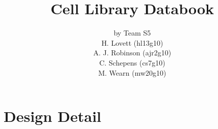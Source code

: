 \documentclass{article}         %
\newcommand{\cellname}[1] {\newpage \section{#1} \makebox[\linewidth]{\rule{\textwidth}{0.4pt}}}
\begin{document}
\title{Cell Library Databook}

\author{by Team S5\\ H. Lovett (hl13g10) \\ A. J. Robinson (ajr2g10) \\ C. Schepens (cs7g10) \\ M. Wearn (mw20g10)}
\maketitle
\cleardoublepage
\tableofcontents













%




%
%





\appendix


\clearpage
\section{Design Detail}
\renewcommand{\cellname}[1] {\newpage \subsection{#1} \makebox[\linewidth]{\rule{\textwidth}{0.4pt}}}
\newcommand{\stickdiagram}[1]{\subsubsection*{Stick Diagram} \texttt{[image: \#1]}}
\newcommand{\transistor}[1]{\subsubsection*{Transistor Level Circuit Diagram} \texttt{[image: \#1]}}








\end{document}
